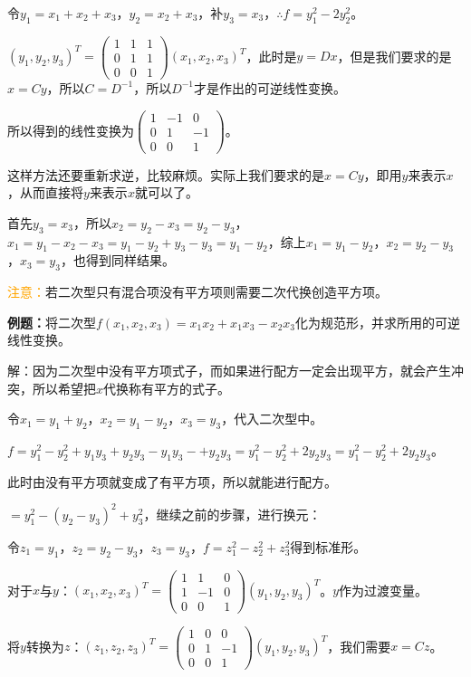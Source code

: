 \documentclass[UTF8, 12pt]{ctexart}
\begin{document}
令$y_1=x_1+x_2+x_3$，$y_2=x_2+x_3$，补$y_3=x_3$，$\therefore f=y_1^2-2y_2^2$。

$(y_1,y_2,y_3)^T=\left(\begin{array}{ccc}
    1 & 1 & 1 \\
    0 & 1 & 1 \\
    0 & 0 & 1
\end{array}\right)(x_1,x_2,x_3)^T$，此时是$y=Dx$，但是我们要求的是$x=Cy$，所以$C=D^{-1}$，所以$D^{-1}$才是作出的可逆线性变换。

所以得到的线性变换为$\left(\begin{array}{ccc}
    1 & -1 & 0 \\
    0 & 1 & -1 \\
    0 & 0 & 1
\end{array}\right)$。

这样方法还要重新求逆，比较麻烦。实际上我们要求的是$x=Cy$，即用$y$来表示$x$，从而直接将$y$来表示$x$就可以了。

首先$y_3=x_3$，所以$x_2=y_2-x_3=y_2-y_3$，$x_1=y_1-x_2-x_3=y_1-y_2+y_3-y_3=y_1-y_2$，综上$x_1=y_1-y_2$，$x_2=y_2-y_3$，$x_3=y_3$，也得到同样结果。

\textcolor{orange}{注意：}若二次型只有混合项没有平方项则需要二次代换创造平方项。

\textbf{例题：}将二次型$f(x_1,x_2,x_3)=x_1x_2+x_1x_3-x_2x_3$化为规范形，并求所用的可逆线性变换。

解：因为二次型中没有平方项式子，而如果进行配方一定会出现平方，就会产生冲突，所以希望把$x$代换称有平方的式子。

令$x_1=y_1+y_2$，$x_2=y_1-y_2$，$x_3=y_3$，代入二次型中。

$f=y_1^2-y_2^2+y_1y_3+y_2y_3-y_1y_3-+y_2y_3=y_1^2-y_2^2+2y_2y_3=y_1^2-y_2^2+2y_2y_3$。

此时由没有平方项就变成了有平方项，所以就能进行配方。

$=y_1^2-(y_2-y_3)^2+y_3^2$，继续之前的步骤，进行换元：

令$z_1=y_1$，$z_2=y_2-y_3$，$z_3=y_3$，$f=z_1^2-z_2^2+z_3^2$得到标准形。

对于$x$与$y$：$(x_1,x_2,x_3)^T=\left(\begin{array}{ccc}
    1 & 1 & 0 \\
    1 & -1 & 0 \\
    0 & 0 & 1
\end{array}\right)(y_1,y_2,y_3)^T$。$y$作为过渡变量。

将$y$转换为$z$：$(z_1,z_2,z_3)^T=\left(\begin{array}{ccc}
    1 & 0 & 0 \\
    0 & 1 & -1 \\
    0 & 0 & 1
\end{array}\right)(y_1,y_2,y_3)^T$，我们需要$x=Cz$。
\end{document}
